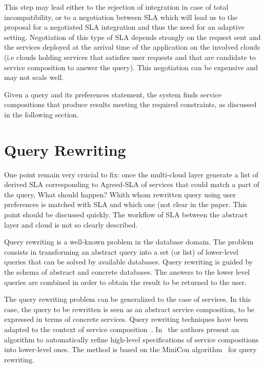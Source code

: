 This step may lead either to the rejection of integration in case of total incompatibility, or to a negotiation between SLA which will lead us to the proposal for a negotiated SLA integration and thus the need for an adaptive setting.
Negotiation of this type of SLA depends strongly on the request sent and the services deployed at the arrival time of the application on the involved  clouds (i.e clouds holding services that satisfies user requests and that are candidate to service composition to answer the query). This negotiation can be expensive and may not scale well.
 
Given a query and its preferences statement, the system  finds  service compositions that produce results   meeting the required constraints, as discussed in the following section.
 
\section{Query Rewriting}
\label{sec:queryRew}

\color{red}
One point remain very crucial to fix: once the multi-cloud layer generate a list of derived SLA corresponding to Agreed-SLA of services that could match a part of the query, What should happen?  Whith whom rewritten query using user preferences is matched with SLA and which one (not clear in the paper.  This point should be discussed quickly. The workflow of SLA between the abstract layer and cloud is not so clearly described.


\color{black}
Query rewriting is a well-known problem in the database domain.
The problem consists in transforming an abstract query into a set (or list) of lower-level queries that can be solved by  available databases.
Query rewriting is guided by the schema of  abstract and concrete databases.
The answers to the lower level queries are combined in order to obtain the result to be returned to the user.

The query rewriting problem can be generalized to the case of services.
In this case, the query to be rewritten is seen as an abstract service composition, to be expressed in terms of concrete services.
Query rewriting techniques have been adapted to the context of service composition~\cite{BBM10,ZLC11,CostaAMR13}. 
In~\cite{CostaAMR13} the authors present an algorithm to automatically refine high-level specifications of service compositions into lower-level ones. 
The method is based on the MiniCon algorithm~\cite{PH01} for query rewriting.

